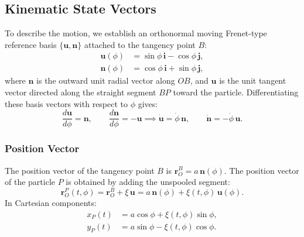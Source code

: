 \documentclass[11pt,a4paper]{article}
\begin{document}
\subsection{Kinematic State Vectors}
To describe the motion, we establish an orthonormal moving Frenet-type reference basis $\{\mathbf{u}, \mathbf{n}\}$ attached to the tangency point $B$:
\begin{align}
    \label{eq:basis_u}
    \mathbf{u}(\phi) &= \sin\phi\,\mathbf{i} - \cos\phi\,\mathbf{j}, \\
    \label{eq:basis_n}
    \mathbf{n}(\phi) &= \cos\phi\,\mathbf{i} + \sin\phi\,\mathbf{j},
\end{align}
where $\mathbf{n}$ is the outward unit radial vector along $OB$, and $\mathbf{u}$ is the unit tangent vector directed along the straight segment $BP$ toward the particle. Differentiating these basis vectors with respect to $\phi$ gives:
\begin{equation}
    \label{eq:basis_derivs}
    \frac{d\mathbf{u}}{d\phi} = \mathbf{n}, \qquad \frac{d\mathbf{n}}{d\phi} = -\mathbf{u} \implies \dot{\mathbf{u}} = \dot{\phi}\,\mathbf{n}, \qquad \dot{\mathbf{n}} = -\dot{\phi}\,\mathbf{u}.
\end{equation}

\subsubsection{Position Vector}
The position vector of the tangency point $B$ is $\mathbf{r}_O^B = a\,\mathbf{n}(\phi)$. The position vector of the particle $P$ is obtained by adding the unspooled segment:
\begin{equation}
    \label{eq:pos_P}
    \mathbf{r}_O^P(t, \phi) = \mathbf{r}_O^B + \xi\,\mathbf{u} = a\,\mathbf{n}(\phi) + \xi(t, \phi)\,\mathbf{u}(\phi).
\end{equation}
In Cartesian components:
\begin{align}
    x_P(t) &= a\cos\phi + \xi(t, \phi)\sin\phi, \\
    y_P(t) &= a\sin\phi - \xi(t, \phi)\cos\phi.
\end{align}
\end{document}

